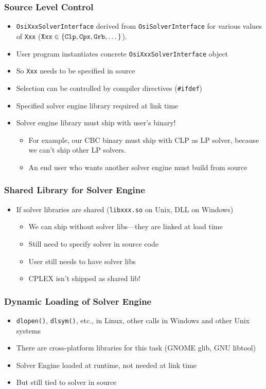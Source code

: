 \documentclass{beamer}
\begin{document}
\begin{frame}
  \frametitle{Source Level Control}
  \begin{itemize}
  \item \texttt{OsiXxxSolverInterface} derived from
    \texttt{OsiSolverInterface} for various values of \texttt{Xxx}
    ($\text{\texttt{Xxx}} \in \{\text{\texttt{Clp}}, \text{\texttt{Cpx}},
  \text{\texttt{Grb}}, \dots \}$).
  \item User program instantiates concrete
    \texttt{OsiXxxSolverInterface} object
  \item So \texttt{Xxx} needs to be specified in source
  \item Selection can be controlled by compiler directives
    (\texttt{\#ifdef}) 
  \item Specified solver engine library required at link time
    \pause
  \item Solver engine library must ship with user's binary!
    \begin{itemize}
    \item For example, our CBC binary must ship with CLP as LP
      solver, because we can't ship other LP solvers.
    \item An end user who wants another solver engine must build
      from source
    \end{itemize}

  \end{itemize}
\end{frame}

\begin{frame}
  \frametitle{Shared Library for Solver Engine}

  \begin{itemize}
  \item If solver libraries are shared (\texttt{libxxx.so} on Unix,
    DLL on Windows)
    \begin{itemize}
    \item We can ship without solver libs---they are linked at load time
    \item Still need to specify solver in source code
    \item User still needs to have solver libs
    \item CPLEX isn't shipped as shared lib!
    \end{itemize}
  \end{itemize}
\end{frame}

\begin{frame}
  \frametitle{Dynamic Loading of Solver Engine}
  \begin{itemize}
  \item \texttt{dlopen()}, \texttt{dlsym()}, etc., in Linux, other
    calls in Windows and other Unix systems
  \item There are cross-platform libraries for this task (GNOME
    glib, GNU libtool)
  \item Solver Engine loaded at runtime, not needed at link time
  \item But still tied to solver in source
  \end{itemize}
\end{frame}
\end{document}
